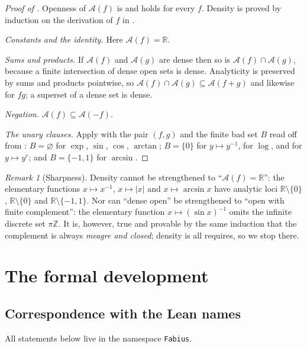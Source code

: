 \documentclass[11pt,oneside]{article}
\theoremstyle{definition}
\theoremstyle{remark}
\newtheorem{remark}[theorem]{Remark}
\newcommand{\R}{\mathbb R}
\newcommand{\Z}{\mathbb Z}
\newcommand{\An}{\mathcal A}
\begin{document}
\begin{proof}[Proof of ]
Openness of $\An(f)$ is  and holds for every $f$.  Density is
proved by induction on the derivation of $f$ in .

\emph{Constants and the identity.}  Here $\An(f)=\R$.

\emph{Sums and products.}  If $\An(f)$ and $\An(g)$ are dense then so is
$\An(f)\cap\An(g)$, because a finite intersection of dense open sets is dense.
Analyticity is preserved by sums and products pointwise, so
$\An(f)\cap\An(g)\subseteq\An(f+g)$ and likewise for $fg$; a superset of a
dense set is dense.

\emph{Negation.}  $\An(f)\subseteq\An(-f)$.

\emph{The unary clauses.}  Apply  with the pair $(f,g)$ and the
finite bad set $B$ read off from : $B=\varnothing$ for
$\exp$, $\sin$, $\cos$, $\arctan$; $B=\{0\}$ for $y\mapsto y^{-1}$, for
$\log$, and for $y\mapsto y^{r}$; and $B=\{-1,1\}$ for $\arcsin$.
\end{proof}

\begin{remark}[Sharpness]
Density cannot be strengthened to ``$\An(f)=\R$'': the elementary functions
$x\mapsto x^{-1}$, $x\mapsto|x|$ and $x\mapsto\arcsin x$ have analytic loci
$\R\setminus\{0\}$, $\R\setminus\{0\}$ and $\R\setminus\{-1,1\}$.  Nor can
``dense open'' be strengthened to ``open with finite complement'': the
elementary function $x\mapsto (\sin x)^{-1}$ omits the infinite discrete set
$\pi\Z$.  It is, however, true and provable by the same induction that the
complement is always \emph{meagre and closed}; density is all 
requires, so we stop there.
\end{remark}

\section{The formal development}

\subsection{Correspondence with the Lean names}

All statements below live in the namespace \texttt{Fabius}.
\end{document}

